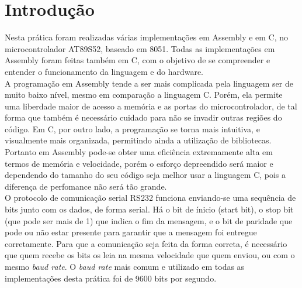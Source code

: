 \documentclass[
    a4paper,
    brazil
    ]{article}
\begin{document}
\newpage
\newpage

\tableofcontents
\newpage
\listoffigures
\newpage


 


\section{Introdução}

    Nesta prática foram realizadas várias implementações em Assembly e em C, no microcontrolador AT89S52, baseado em 8051. Todas as implementações em Assembly foram feitas também em C, com o objetivo de se compreender e entender o funcionamento da linguagem e do hardware.\\
    
    A programação em Assembly tende a ser mais complicada pela linguagem ser de muito baixo nível, mesmo em comparação a linguagem C. Porém, ela permite uma liberdade maior de acesso a memória e as portas do microcontrolador, de tal forma que também é necessário cuidado para não se invadir outras regiões do código. Em C, por outro lado, a programação se torna mais intuitiva, e visualmente mais organizada, permitindo ainda a utilização de bibliotecas. Portanto em Assembly pode-se obter uma eficiência extremamente alta em termos de memória e velocidade, porém o esforço depreendido será maior e dependendo do tamanho do seu código seja melhor usar a linguagem C, pois a diferença de perfomance não será tão grande.\\
    
    O protocolo de comunicação serial RS232 funciona enviando-se uma sequência de bits junto com os dados, de forma serial. Há o bit de ínicio (start bit), o stop bit (que pode ser mais de 1) que indica o fim da mensagem,  e o bit de paridade que pode ou não estar presente para garantir que a mensagem foi entregue corretamente. Para que a comunicação seja feita da forma correta, é necessário que quem recebe os bits os leia na mesma velocidade que quem enviou, ou com o mesmo \emph{baud rate}. O \emph{baud rate} mais comum e utilizado em todas as implementações desta prática foi de 9600 bits por segundo.\\
    
\end{document}
